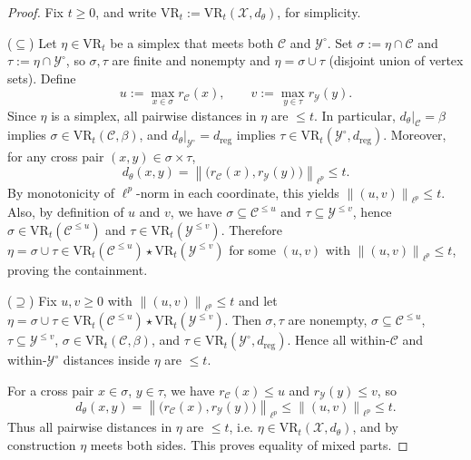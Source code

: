 \documentclass[11pt]{amsart}
\theoremstyle{definition}
\theoremstyle{remark}
\newcommand{\1}{\mathbbm{1}}
\newcommand{\norm}[1]{\left\lVert #1\right\rVert}
\begin{document}
\begin{proof}
Fix \(t\ge 0\), and write \(\mathrm{VR}_t:=\mathrm{VR}_t(\mathcal X,d_\theta)\), for simplicity.

\smallskip
\noindent

($\subseteq$) Let \(\eta\in \mathrm{VR}_t\) be a simplex that meets both \(\mathcal C\) and \(\mathcal Y^\circ\).
Set \(\sigma:=\eta\cap\mathcal C\) and \(\tau:=\eta\cap\mathcal Y^\circ\), so \(\sigma,\tau\) are finite and nonempty and
\(\eta=\sigma\cup\tau\) (disjoint union of vertex sets).
Define
\[
u:=\max_{x\in\sigma} r_{\mathcal C}(x),\qquad v:=\max_{y\in\tau} r_{\mathcal Y}(y).
\]
Since \(\eta\) is a simplex, all pairwise distances in \(\eta\) are \(\le t\).
In particular, \(d_\theta|_{\mathcal C}=\beta\) implies \(\sigma\in \mathrm{VR}_t(\mathcal C,\beta)\),
and \(d_\theta|_{\mathcal Y^\circ}=d_{\mathrm{reg}}\) implies \(\tau\in \mathrm{VR}_t(\mathcal Y^\circ,d_{\mathrm{reg}})\).
Moreover, for any cross pair \((x,y)\in\sigma\times\tau\),
\[
d_\theta(x,y)=\norm{\bigl(r_{\mathcal C}(x),r_{\mathcal Y}(y)\bigr)}_{\ell^p}\le t.
\]
By monotonicity of \(\ell^p\)-norm in each coordinate, this yields \(\norm{(u,v)}_{\ell^p}\le t\).
Also, by definition of \(u\) and \(v\), we have \(\sigma\subseteq\mathcal C^{\le u}\) and \(\tau\subseteq\mathcal Y^{\le v}\),
hence \(\sigma\in \mathrm{VR}_t(\mathcal C^{\le u})\) and \(\tau\in \mathrm{VR}_t(\mathcal Y^{\le v})\).
Therefore \(\eta=\sigma\cup\tau\in \mathrm{VR}_t(\mathcal C^{\le u})\star \mathrm{VR}_t(\mathcal Y^{\le v})\)
for some \((u,v)\) with \(\norm{(u,v)}_{\ell^p}\le t\), proving the containment.

\smallskip
\noindent


($\supseteq$) Fix \(u,v\ge 0\) with \(\norm{(u,v)}_{\ell^p}\le t\) and let
\(\eta=\sigma\cup\tau\in \mathrm{VR}_t(\mathcal C^{\le u})\star \mathrm{VR}_t(\mathcal Y^{\le v})\).
Then \(\sigma,\tau\) are nonempty, \(\sigma\subseteq \mathcal C^{\le u}\), \(\tau\subseteq \mathcal Y^{\le v}\),
\(\sigma\in\mathrm{VR}_t(\mathcal C,\beta)\), and \(\tau\in\mathrm{VR}_t(\mathcal Y^\circ,d_{\mathrm{reg}})\).
Hence all within-\(\mathcal C\) and within-\(\mathcal Y^\circ\) distances inside \(\eta\) are \(\le t\).

For a cross pair \(x\in\sigma\), \(y\in\tau\), we have \(r_{\mathcal C}(x)\le u\) and \(r_{\mathcal Y}(y)\le v\), so
\[
d_\theta(x,y)=\norm{\bigl(r_{\mathcal C}(x),r_{\mathcal Y}(y)\bigr)}_{\ell^p}
\le \norm{(u,v)}_{\ell^p}\le t.
\]
Thus all pairwise distances in $\eta$ are $\le t$, i.e. \(\eta\in \mathrm{VR}_t(\mathcal X,d_\theta)\),
and by construction $\eta$ meets both sides. This proves equality of mixed parts.


\end{proof}
\end{document}

